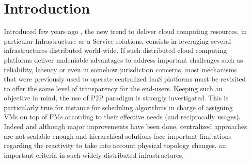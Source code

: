 \section{Introduction}
Introduced few years ago \cite{greenberg:sigcomm09}, the new trend to deliver
cloud computing resources, in particular Infrastructure as a Service solutions,
consists in leveraging several infrastructures  distributed world-wide. If
such distributed cloud computing platforms deliver undeniable advantages to address important
challenges such as reliability, latency or even in somehow jurisdiction
concerns, most mechanisms that were previously used to operate centralized IaaS
platforms must be revisited to offer the same level of transparency for the end-users. 
Keeping such an objective in mind, the use of P2P
paradigm is strongly investigated. 
This is particularly true for instance for scheduling algorithms in charge of assigning
VMs on top of PMs according to their effective needs (and reciprocally usages). 
Indeed and although major improvements have
been done, centralized approaches \cite{hermenier:2013} are not scalable enough
and hierarchical solutions \cite{feller:ccgrid12} face important limitations
regarding the reactivity to take into account physical topology changes, an
important criteria in such widely distributed infrastructures. 
 
